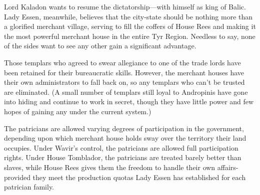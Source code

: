 {	Lord Kaladon wants to resume the dictatorship---with himself as king of Balic. Lady Essen, meanwhile, believes that the city-state should be nothing more than a glorified merchant village, serving to fill the coffers of House Rees and making it the most powerful merchant house in the entire Tyr Region. Needless to say, none of the sides want to see any other gain a significant advantage.

	Those templars who agreed to swear allegiance to one of the trade lords have been retained for their bureaucratic skills. However, the merchant houses have their own administrators to fall back on, so any templars who can't be trusted are eliminated. (A small number of templars still loyal to Andropinis have gone into hiding and continue to work in secret, though they have little power and few hopes of gaining any under the current system.)

	The patricians are allowed varying degrees of participation in the government, depending upon which merchant house holds sway over the territory their land occupies. Under Wavir's control, the patricians are allowed full participation rights. Under House Tomblador, the patricians are treated barely better than slaves, while House Rees gives them the freedom to handle their own affairs-provided they meet the production quotas Lady Essen has established for each patrician family.
}

